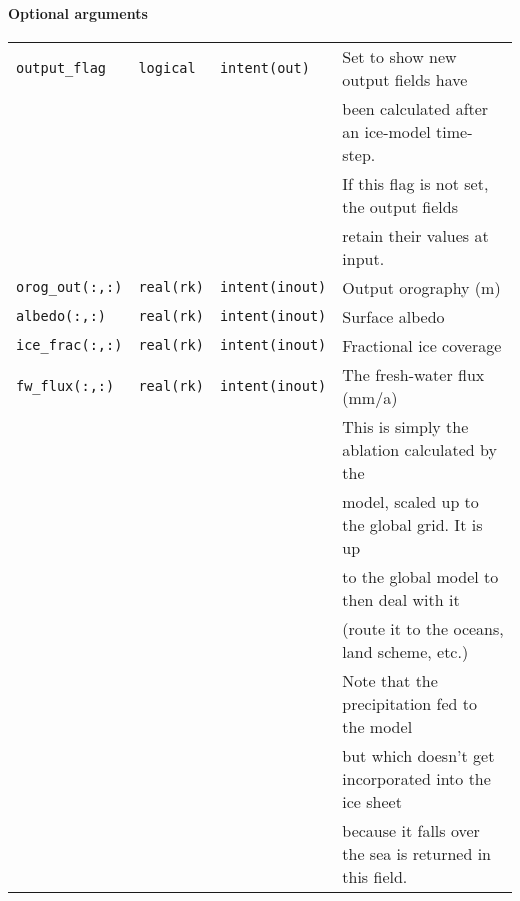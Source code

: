 \documentclass[11pt]{article}
\begin{document}
\paragraph{Optional arguments}
%
\begin{center}
\begin{tabular}{llll}
\texttt{output\_flag} & \texttt{logical} & \texttt{intent(out)} & Set to show
new output fields have \\
 & & & been calculated after an ice-model time-step. \\
 & & & If this flag is not set, the output fields \\
 & & & retain their values at input. \\
\texttt{orog\_out(:,:)} & \texttt{real(rk)} & \texttt{intent(inout)} & Output
orography (m)\\ 
\texttt{albedo(:,:)} & \texttt{real(rk)} & \texttt{intent(inout)} & Surface
albedo \\
\texttt{ice\_frac(:,:)} & \texttt{real(rk)} & \texttt{intent(inout)} &
Fractional ice coverage \\
\texttt{fw\_flux(:,:)} & \texttt{real(rk)} & \texttt{intent(inout)} & The
fresh-water flux (mm/a) \\
 & & & This is simply the ablation calculated by the \\
 & & & model, scaled up to the global grid. It is up \\
 & & & to the global model to then  deal with it \\
 & & & (route it to the oceans, land scheme, etc.) \\
 & & & Note that the precipitation fed to the model \\
 & & & but which doesn't get incorporated into the ice sheet \\
 & & & because it falls over the sea is returned in this field. \\
\end{tabular}
\end{center}
\end{document}
